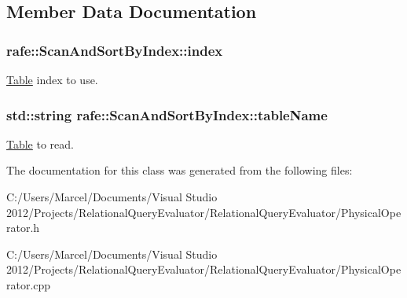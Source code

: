 \subsection{Member Data Documentation}
\hypertarget{classrafe_1_1_scan_and_sort_by_index_a098de983bcb2456f2b904bea0dbd2bb8}{
\subsubsection[{index}]{ rafe\+::\+Scan\+And\+Sort\+By\+Index\+::index}}\label{classrafe_1_1_scan_and_sort_by_index_a098de983bcb2456f2b904bea0dbd2bb8}
\hyperlink{classrafe_1_1_table}{Table} index to use. \hypertarget{classrafe_1_1_scan_and_sort_by_index_abdcff33645fc0806646167276cc3c46f}{
\subsubsection[{table\+Name}]{\setlength{\rightskip}{0pt plus 5cm}std\+::string rafe\+::\+Scan\+And\+Sort\+By\+Index\+::table\+Name}}\label{classrafe_1_1_scan_and_sort_by_index_abdcff33645fc0806646167276cc3c46f}
\hyperlink{classrafe_1_1_table}{Table} to read. 

The documentation for this class was generated from the following files\+:\begin{DoxyCompactItemize}
\item 
C\+:/\+Users/\+Marcel/\+Documents/\+Visual Studio 2012/\+Projects/\+Relational\+Query\+Evaluator/\+Relational\+Query\+Evaluator/Physical\+Operator.\+h\item 
C\+:/\+Users/\+Marcel/\+Documents/\+Visual Studio 2012/\+Projects/\+Relational\+Query\+Evaluator/\+Relational\+Query\+Evaluator/Physical\+Operator.\+cpp\end{DoxyCompactItemize}
